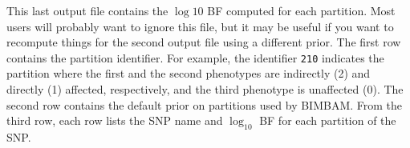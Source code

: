 \documentclass[11pt]{article}
\def\logten{\log_{10}}
\begin{document}
This last output file contains the $\log10$ BF computed for each partition. Most users will probably want to ignore this file, but it may be useful if you want to recompute things for the second output file using a different prior.
The first row contains the partition identifier. 
For example, the identifier \verb+210+ indicates the partition where the first and the second phenotypes are indirectly (2) and directly (1) affected, respectively, and the third phenotype is unaffected (0). 
The second row contains the default prior on partitions used by BIMBAM. 
From the third row, each row lists the SNP name and $\logten$ BF for each partition of the SNP.





\end{document}
